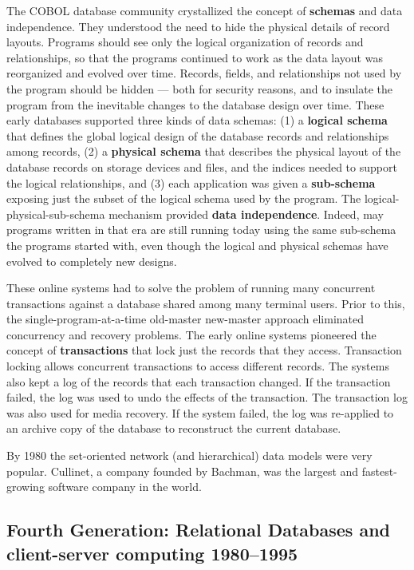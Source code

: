\documentclass[a4paper,12pt,notitlepage,twoside,openright]{article}
\begin{document}
The COBOL database community crystallized the concept of
\textbf{schemas} and data independence. They understood the need to hide
the physical details of record layouts. Programs should see only the
logical organization of records and relationships, so that the programs
continued to work as the data layout was reorganized and evolved over
time. Records, fields, and relationships not used by the program should
be hidden --- both for security reasons, and to insulate the program from
the inevitable changes to the database design over time. These early
databases supported three kinds of data schemas: (1) a \textbf{logical
schema} that defines the global logical design of the database records
and relationships among records, (2) a \textbf{physical schema} that
describes the physical layout of the database records on storage devices
and files, and the indices needed to support the logical relationships,
and (3) each application was given a \textbf{sub-schema} exposing just
the subset of the logical schema used by the program. The
logical-physical-sub-schema mechanism provided \textbf{data
independence}. Indeed, may programs written in that era are still
running today using the same sub-schema the programs started with, even
though the logical and physical schemas have evolved to completely new
designs.

These online systems had to solve the problem of running many concurrent
transactions against a database shared among many terminal users. Prior
to this, the single-program-at-a-time old-master new-master approach
eliminated concurrency and recovery problems. The early online systems
pioneered the concept of \textbf{transactions} that lock just the
records that they access. Transaction locking allows concurrent
transactions to access different records. The systems also kept a log of
the records that each transaction changed. If the transaction failed,
the log was used to undo the effects of the transaction. The transaction
log was also used for media recovery. If the system failed, the log was
re-applied to an archive copy of the database to reconstruct the current
database.

By 1980 the set-oriented network (and hierarchical) data models were
very popular. Cullinet, a company founded by Bachman, was the largest
and fastest-growing software company in the world.

\hypertarget{fourth-generation-relational-databases-and-client-server-computing-1980--1995}{%
\subsection{Fourth Generation: Relational Databases and client-server computing 1980--1995}\label{fourth-generation-relational-databases-and-client-server-computing-1980-1995}}
\end{document}
